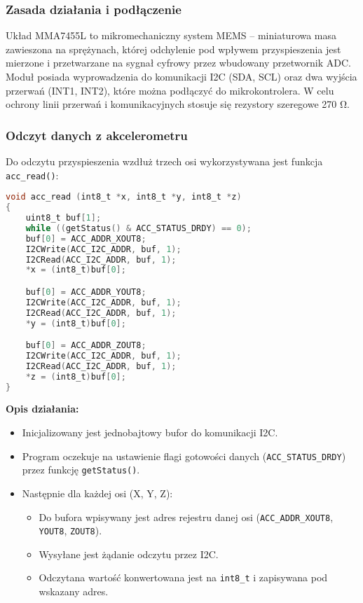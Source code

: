 \documentclass[a4paper,12pt]{report}
\begin{document}
\subsubsection*{Zasada działania i podłączenie}

Układ MMA7455L to mikromechaniczny system MEMS – miniaturowa masa zawieszona na sprężynach, której odchylenie pod wpływem przyspieszenia jest mierzone i przetwarzane na sygnał cyfrowy przez wbudowany przetwornik ADC. Moduł posiada wyprowadzenia do komunikacji I2C (SDA, SCL) oraz dwa wyjścia przerwań (INT1, INT2), które można podłączyć do mikrokontrolera. W celu ochrony linii przerwań i komunikacyjnych stosuje się rezystory szeregowe 270 \si{\ohm}.

\subsubsection*{Odczyt danych z akcelerometru}

Do odczytu przyspieszenia wzdłuż trzech osi wykorzystywana jest funkcja \texttt{acc\_read()}:

\begin{lstlisting}[language=C]
void acc_read (int8_t *x, int8_t *y, int8_t *z)
{
    uint8_t buf[1];
    while ((getStatus() & ACC_STATUS_DRDY) == 0);
    buf[0] = ACC_ADDR_XOUT8;
    I2CWrite(ACC_I2C_ADDR, buf, 1);
    I2CRead(ACC_I2C_ADDR, buf, 1);
    *x = (int8_t)buf[0];

    buf[0] = ACC_ADDR_YOUT8;
    I2CWrite(ACC_I2C_ADDR, buf, 1);
    I2CRead(ACC_I2C_ADDR, buf, 1);
    *y = (int8_t)buf[0];

    buf[0] = ACC_ADDR_ZOUT8;
    I2CWrite(ACC_I2C_ADDR, buf, 1);
    I2CRead(ACC_I2C_ADDR, buf, 1);
    *z = (int8_t)buf[0];
}
\end{lstlisting}

\textbf{Opis działania:}
\begin{itemize}
    \item Inicjalizowany jest jednobajtowy bufor do komunikacji I2C.
    \item Program oczekuje na ustawienie flagi gotowości danych (\texttt{ACC\_STATUS\_DRDY}) przez funkcję \texttt{getStatus()}.
    \item Następnie dla każdej osi (X, Y, Z):
    \begin{itemize}
        \item Do bufora wpisywany jest adres rejestru danej osi (\texttt{ACC\_ADDR\_XOUT8}, \texttt{YOUT8}, \texttt{ZOUT8}).
        \item Wysyłane jest żądanie odczytu przez I2C.
        \item Odczytana wartość konwertowana jest na \texttt{int8\_t} i zapisywana pod wskazany adres.
    \end{itemize}
\end{itemize}
\end{document}
